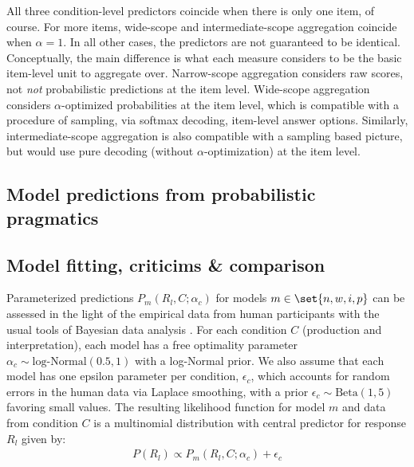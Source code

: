 \documentclass{article}
\begin{document}
All three condition-level predictors coincide when there is only one item, of course.
For more items, wide-scope and intermediate-scope aggregation coincide when $\alpha = 1$.
In all other cases, the predictors are not guaranteed to be identical.
Conceptually, the main difference is what each measure considers to be the basic item-level unit to aggregate over.
Narrow-scope aggregation considers raw scores, not \emph{not} probabilistic predictions at the item level.
Wide-scope aggregation considers $\alpha$-optimized probabilities at the item level, which is compatible with a procedure of sampling, via softmax decoding, item-level answer options.
Similarly, intermediate-scope aggregation is also compatible with a sampling based picture, but would use pure decoding (without $\alpha$-optimization) at the item level.

\subsection{Model predictions from probabilistic pragmatics}
\label{sec:model-pred-from}



\subsection{Model fitting, criticims \& comparison}
\label{sec:model-fitting}

Parameterized predictions $P_{m}(R_{l}, C ; \alpha_{c})$ for models $m \in \set{n,w,i,p}$ can be assessed in the light of the empirical data from human participants with the usual tools of Bayesian data analysis \citep[e.g.][]{GelmanCarlin2014:Bayesian-Data-A,McElreath2016:Statistical-Ret,Lambert2018:A-Students-Guid}.
For each condition $C$ (production and interpretation), each model has a free optimality parameter $\alpha_{c}\sim \text{log-Normal}(0.5,1)$ with a log-Normal prior.
We also assume that each model has one epsilon parameter per condition, $\epsilon_{c}$, which accounts for random errors in the human data via Laplace smoothing, with a prior $\epsilon_{c} \sim \text{Beta}(1,5)$ favoring small values.
The resulting likelihood function for model $m$ and data from condition $C$ is a multinomial distribution with central predictor for response $R_{l}$ given by:
%
\begin{align*}
  P(R_{l}) \propto P_{m}(R_{l}, C; \alpha_{c}) +  \epsilon_{c}
\end{align*}
\end{document}
